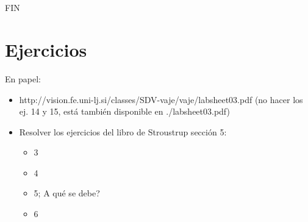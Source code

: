 \documentclass[xcolor=table,spanish,9pt]{beamer}
\begin{document}
%         
% 



\section*{ }
\begin{frame}
  \begin{block}{\mbox{}}
    \centering \Huge FIN
  \end{block}
\end{frame}



\section*{Ejercicios}

\begin{frame}[fragile]
  \begin{block}{En papel:}
    \begin{itemize}
      \item http://vision.fe.uni-lj.si/classes/SDV-vaje/vaje/labsheet03.pdf (no hacer los ej. 14 y 15, está también disponible en ./labsheet03.pdf)
      \item Resolver los ejercicios del libro de Stroustrup sección 5:
      \begin{itemize}
	\item 3
	\item 4
	\item 5; A qué se debe?
	\item 6
      \end{itemize}
    \end{itemize}
  \end{block}
\end{frame}
\end{document}
